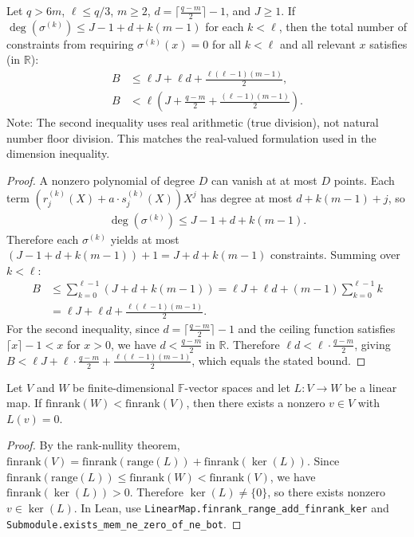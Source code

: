 \begin{lemma}\label{lem:stepanov-system-constraint-count} \leanok {}
  Let $q > 6m$, $\ell \leq q/3$, $m \geq 2$, $d = \lceil\frac{q-m}{2}\rceil - 1$, and $J \geq 1$. If $\deg(\sigma^{(k)}) \leq J-1 + d + k(m-1)$ for each $k < \ell$, then the total number of constraints from requiring $\sigma^{(k)}(x) = 0$ for all $k < \ell$ and all relevant $x$ satisfies (in $\mathbb{R}$):
  \begin{align*}
    B & \leq \ell J + \ell d + \frac{\ell(\ell-1)(m-1)}{2},              \\
    B & < \ell \left(J + \frac{q-m}{2} + \frac{(\ell-1)(m-1)}{2}\right).
  \end{align*}
  Note: The second inequality uses real arithmetic (true division), not natural number floor division. This matches the real-valued formulation used in the dimension inequality.
\end{lemma}
\begin{proof} \leanok
  A nonzero polynomial of degree $D$ can vanish at at most $D$ points. Each term $(r_j^{(k)}(X) + a \cdot s_j^{(k)}(X)) X^j$ has degree at most $d + k(m-1) + j$, so
  \begin{align*}
    \deg(\sigma^{(k)}) \leq J-1 + d + k(m-1).
  \end{align*}
  Therefore each $\sigma^{(k)}$ yields at most $(J-1 + d + k(m-1)) + 1 = J + d + k(m-1)$ constraints. Summing over $k < \ell$:
  \begin{align*}
    B & \leq \sum_{k=0}^{\ell-1} (J + d + k(m-1)) = \ell J + \ell d + (m-1)\sum_{k=0}^{\ell-1} k \\
      & = \ell J + \ell d + \frac{\ell(\ell-1)(m-1)}{2}.
  \end{align*}
  For the second inequality, since $d = \lceil\frac{q-m}{2}\rceil - 1$ and the ceiling function satisfies $\lceil x \rceil - 1 < x$ for $x > 0$, we have $d < \frac{q-m}{2}$ in $\mathbb{R}$. Therefore $\ell d < \ell \cdot \frac{q-m}{2}$, giving $B < \ell J + \ell \cdot \frac{q-m}{2} + \frac{\ell(\ell-1)(m-1)}{2}$, which equals the stated bound.
\end{proof}

\begin{lemma}\label{lem:exists-nonzero-solution-of-finrank-lt} \leanok {}
  Let $V$ and $W$ be finite-dimensional $\mathbb{F}$-vector spaces and let $L : V \to W$ be a linear map. If $\mathrm{finrank}(W) < \mathrm{finrank}(V)$, then there exists a nonzero $v \in V$ with $L(v) = 0$.
\end{lemma}
\begin{proof} \leanok
  By the rank-nullity theorem, $\mathrm{finrank}(V) = \mathrm{finrank}(\mathrm{range}(L)) + \mathrm{finrank}(\ker(L))$. Since $\mathrm{finrank}(\mathrm{range}(L)) \leq \mathrm{finrank}(W) < \mathrm{finrank}(V)$, we have $\mathrm{finrank}(\ker(L)) > 0$. Therefore $\ker(L) \neq \{0\}$, so there exists nonzero $v \in \ker(L)$. In Lean, use \texttt{LinearMap.finrank\_range\_add\_finrank\_ker} and \texttt{Submodule.exists\_mem\_ne\_zero\_of\_ne\_bot}.
\end{proof}

